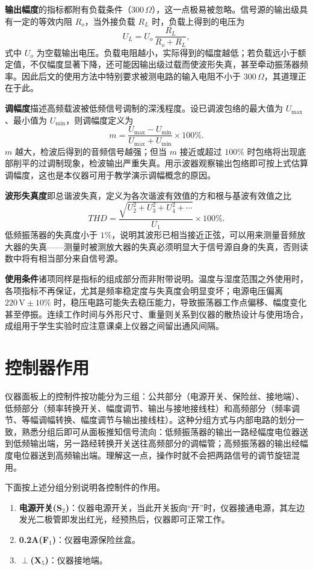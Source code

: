 \documentclass[12pt,UTF8]{ctexbook}
\begin{document}
\textbf{输出幅度}的指标都附有负载条件（$300\,\Omega$），这一点极易被忽略。信号源的输出级具有一定的等效内阻 $R_o$，当外接负载 $R_L$ 时，负载上得到的电压为
\[
U_L = U_o\,\frac{R_L}{R_o + R_L},
\]
式中 $U_o$ 为空载输出电压。负载电阻越小，实际得到的幅度越低；若负载远小于额定值，不仅幅度显著下降，还可能因输出级过载而使波形失真，甚至牵动振荡器频率。因此后文的使用方法中特别要求被测电路的输入电阻不小于 $300\,\Omega$，其道理正在于此。

\textbf{调幅度}描述高频载波被低频信号调制的深浅程度。设已调波包络的最大值为 $U_{\max}$、最小值为 $U_{\min}$，则调幅度定义为
\[
m = \frac{U_{\max} - U_{\min}}{U_{\max} + U_{\min}} \times 100\%.
\]
$m$ 越大，检波后得到的音频信号越强；但当 $m$ 接近或超过 $100\%$ 时包络将出现底部削平的过调制现象，检波输出严重失真。用示波器观察输出包络即可按上式估算调幅度，这也是本仪器可用于教学演示调幅概念的原因。

\textbf{波形失真度}即总谐波失真，定义为各次谐波有效值的方和根与基波有效值之比
\[
THD = \frac{\sqrt{U_2^2 + U_3^2 + U_4^2 + \cdots}}{U_1} \times 100\%.
\]
低频振荡器的失真度小于 $1\%$，说明其波形已相当接近正弦，可以用来测量音频放大器的失真——测量时被测放大器的失真必须明显大于信号源自身的失真，否则读数中将有相当部分来自信号源。

\textbf{使用条件}诸项同样是指标的组成部分而非附带说明。温度与湿度范围之外使用时，各项指标不再保证，尤其是频率稳定度与失真度会明显变坏；电源电压偏离 $220\,\mathrm{V} \pm 10\%$ 时，稳压电路可能失去稳压能力，导致振荡器工作点偏移、幅度变化甚至停振。连续工作时间与外形尺寸、重量则关系到仪器的散热设计与使用场合，成组用于学生实验时应注意课桌上仪器之间留出通风间隔。

\section{控制器作用}

仪器面板上的控制件按功能分为三组：公共部分（电源开关、保险丝、接地端）、低频部分（频率转换开关、幅度调节、输出与接地接线柱）和高频部分（频率调节、等幅调幅转换、幅度调节与输出接线柱）。这种分组方式与内部电路的划分一致，熟悉分组后即可从面板推知信号流向：低频振荡器的输出一路经幅度电位器送到低频输出端，另一路经转换开关送往高频部分的调幅管；高频振荡器的输出经幅度电位器送到高频输出端。理解这一点，操作时就不会把两路信号的调节旋钮混用。

下面按上述分组分别说明各控制件的作用。

\begin{enumerate}
\item \textbf{电源开关(S\(_2\))}：仪器电源开关，当此开关扳向“开”时，仪器接通电源，其左边发光二极管即发出红光，经预热后，仪器即可正常工作。
\item \textbf{0.2A(F\(_1\))}：仪器电源保险丝盒。
\item \textbf{\(\perp\)(X\(_5\))}：仪器接地端。
\end{enumerate}
\end{document}
